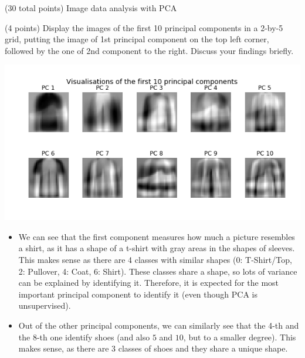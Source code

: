 \documentclass[12pt]{article}
\begin{document}
\begin{question}{(30 total points) Image data analysis with PCA}
\begin{subquestion}
   \end{subquestion}

   \begin{subquestion}{(4 points)
      Display the images of the first 10 principal components in
      a 2-by-5 grid, putting the image of 1st principal component on
      the top left corner, followed by the one of 2nd component to the right.
      Discuss your findings briefly.
     } \label{Q1.disp.pca}
   

      \begin{answerbox}{35em}
         \begin{center}
	\includegraphics[width=\textwidth]{imgs/1_5.png}
	\end{center}
	
	\begin{itemize}
	\itemsep -3pt {}
	\item We can see that the first component measures how much a picture resembles a shirt, as it has a shape of a t-shirt with gray areas in the shapes of sleeves. This makes sense as there are 4 classes with similar shapes (0: T-Shirt/Top, 2: Pullover, 4: Coat, 6: Shirt). These classes share a shape, so lots of variance can be explained by identifying it. Therefore, it is expected for the most important principal component to identify it (even though PCA is unsupervised).
	\item Out of the other principal components, we can similarly see that the 4-th and the 8-th one identify shoes (and also $5$ and $10$, but to a smaller degree). This makes sense, as there are 3 classes of shoes and they share a unique shape.
	\end{itemize}
      \end{answerbox}
  


   \end{subquestion}


\end{question}
\end{document}
